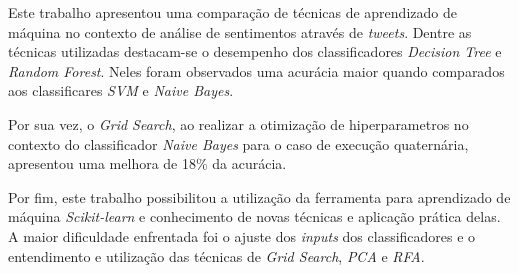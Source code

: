 Este trabalho apresentou uma comparação de técnicas de aprendizado de máquina no contexto de análise de sentimentos através de \textit{tweets}. Dentre as técnicas utilizadas destacam-se o desempenho dos classificadores \textit{Decision Tree} e \textit{Random Forest}. Neles foram observados uma acurácia maior quando comparados aos classificares \textit{SVM} e \textit{Naive Bayes}.

Por sua vez, o \textit{Grid Search}, ao realizar a otimização de hiperparametros no contexto do classificador \textit{Naive Bayes} para o caso de execução quaternária, apresentou uma melhora de 18\% da acurácia.

Por fim, este trabalho possibilitou a utilização da ferramenta para aprendizado de máquina \textit{Scikit-learn} e conhecimento de novas técnicas e aplicação prática delas. A maior dificuldade enfrentada foi o ajuste dos \textit{inputs} dos classificadores e o entendimento e utilização das técnicas de \textit{Grid Search}, \textit{PCA} e \textit{RFA}.